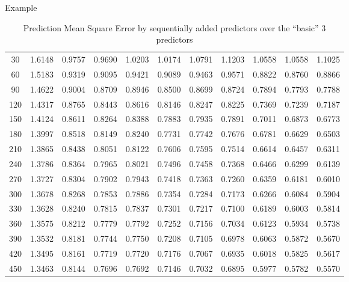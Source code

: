 \documentclass{beamer}
\begin{document}
\begin{frame}{Example}
\begin{table}[h!]
{\begin{tabular}{||c c c c c c c c c c c||}
       30 & 1.6148 & 0.9757 & 0.9690 & 1.0203 & 1.0174 & 1.0791 & 1.1203 & 1.0558 & 1.0558 & 1.1025 \\ 
        60 & 1.5183 & 0.9319 & 0.9095 & 0.9421 & 0.9089 & 0.9463 & 0.9571 & 0.8822 & 0.8760 & 0.8866 \\ 
        90 & 1.4622 & 0.9004 & 0.8709 & 0.8946 & 0.8500 & 0.8699 & 0.8724 & 0.7894 & 0.7793 & 0.7788 \\ 
        120 & 1.4317 & 0.8765 & 0.8443 & 0.8616 & 0.8146 & 0.8247 & 0.8225 & 0.7369 & 0.7239 & 0.7187 \\ 
        150 & 1.4124 & 0.8611 & 0.8264 & 0.8388 & 0.7883 & 0.7935 & 0.7891 & 0.7011 & 0.6873 & 0.6773 \\ 
        180 & 1.3997 & 0.8518 & 0.8149 & 0.8240 & 0.7731 & 0.7742 & 0.7676 & 0.6781 & 0.6629 & 0.6503 \\ 
        210 & 1.3865 & 0.8438 & 0.8051 & 0.8122 & 0.7606 & 0.7595 & 0.7514 & 0.6614 & 0.6457 & 0.6311 \\ 
        240 & 1.3786 & 0.8364 & 0.7965 & 0.8021 & 0.7496 & 0.7458 & 0.7368 & 0.6466 & 0.6299 & 0.6139 \\ 
        270 & 1.3727 & 0.8304 & 0.7902 & 0.7943 & 0.7418 & 0.7363 & 0.7260 & 0.6359 & 0.6181 & 0.6010 \\ 
        300 & 1.3678 & 0.8268 & 0.7853 & 0.7886 & 0.7354 & 0.7284 & 0.7173 & 0.6266 & 0.6084 & 0.5904 \\ 
        330 & 1.3628 & 0.8240 & 0.7815 & 0.7837 & 0.7301 & 0.7217 & 0.7100 & 0.6189 & 0.6003 & 0.5814 \\ 
        360 & 1.3575 & 0.8212 & 0.7779 & 0.7792 & 0.7252 & 0.7156 & 0.7034 & 0.6123 & 0.5934 & 0.5738 \\ 
        390 & 1.3532 & 0.8181 & 0.7744 & 0.7750 & 0.7208 & 0.7105 & 0.6978 & 0.6063 & 0.5872 & 0.5670 \\ 
        420 & 1.3495 & 0.8161 & 0.7719 & 0.7720 & 0.7176 & 0.7067 & 0.6935 & 0.6018 & 0.5825 & 0.5617 \\ 
        450 & 1.3463 & 0.8144 & 0.7696 & 0.7692 & 0.7146 & 0.7032 & 0.6895 & 0.5977 & 0.5782 & 0.5570 \\ 
         \hline\hline
\end{tabular}}
\caption{Prediction Mean Square Error by sequentially added predictors over the “basic” 3 predictors}
\label{table:PMSE}
\end{table}
\end{frame}
\end{document}
